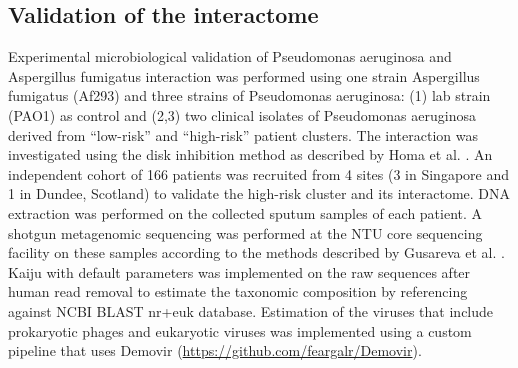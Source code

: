 \subsection{Validation of the interactome}

Experimental microbiological validation of Pseudomonas aeruginosa and Aspergillus fumigatus interaction was performed using one strain Aspergillus fumigatus (Af293) and three strains of Pseudomonas aeruginosa: (1) lab strain (PAO1) as control and (2,3) two clinical isolates of Pseudomonas aeruginosa derived from “low-risk” and “high-risk” patient clusters. The interaction was investigated using the disk inhibition method as described by Homa et al. \cite{Homa2019}.
An independent cohort of 166 patients was recruited from 4 sites (3 in Singapore and 1 in Dundee, Scotland) to validate the high-risk cluster and its interactome. DNA extraction was performed on the collected sputum samples of each patient. A shotgun metagenomic sequencing was performed at the NTU core sequencing facility on these samples according to the methods described by Gusareva et al. \cite{Gusareva2019}. Kaiju \cite{Menzel2016} with default parameters was implemented on the raw sequences after human read removal to estimate the taxonomic composition by referencing against NCBI BLAST nr+euk database. Estimation of the viruses that include prokaryotic phages and eukaryotic viruses was implemented using a custom pipeline that uses Demovir (\url{https://github.com/feargalr/Demovir}).